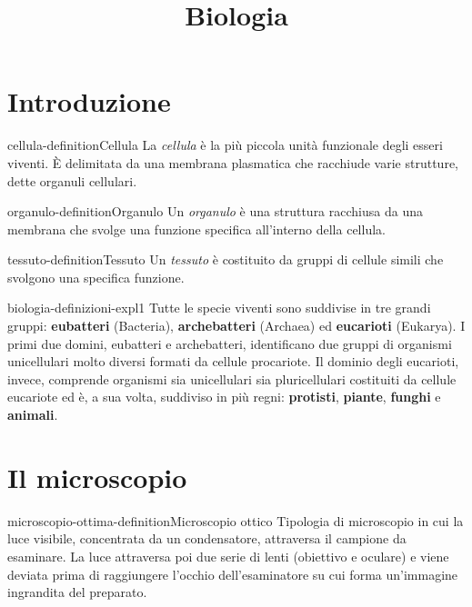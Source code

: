 \documentclass[preview]{standalone}
\begin{document}
\title{Biologia}
\genpage

\section{Introduzione}

\begin{snippetdefinition}{cellula-definition}{Cellula}
    La \textit{cellula} è la più piccola unità funzionale degli esseri
    viventi. È delimitata da una membrana plasmatica
    che racchiude varie strutture, dette organuli cellulari.
\end{snippetdefinition}

\begin{snippetdefinition}{organulo-definition}{Organulo}
    Un \textit{organulo} è una struttura racchiusa da una membrana che svolge
    una funzione specifica all'interno della cellula.
\end{snippetdefinition}

\begin{snippetdefinition}{tessuto-definition}{Tessuto}
    Un \textit{tessuto} è costituito da gruppi
    di cellule simili che svolgono
    una specifica funzione.
\end{snippetdefinition}

\begin{snippet}{biologia-definizioni-expl1}
Tutte le specie viventi sono suddivise in tre grandi gruppi:
\textbf{eubatteri} (Bacteria), \textbf{archebatteri} (Archaea)
ed \textbf{eucarioti} (Eukarya).
I primi due domini, eubatteri e archebatteri, identificano due gruppi di organismi
unicellulari molto diversi formati da cellule
procariote.
Il dominio degli eucarioti, invece, comprende organismi sia unicellulari
sia pluricellulari costituiti da cellule eucariote ed è,
a sua volta, suddiviso in più regni: \textbf{protisti},
\textbf{piante}, \textbf{funghi} e \textbf{animali}.
\end{snippet}

\section{Il microscopio}

\begin{snippetdefinition}{microscopio-ottima-definition}{Microscopio ottico}
    Tipologia di microscopio in cui la luce visibile, concentrata da un condensatore, attraversa
    il campione da esaminare. La luce attraversa poi due serie di lenti (obiettivo e oculare) e
    viene deviata prima di raggiungere l'occhio dell'esaminatore su cui forma un'immagine
    ingrandita del preparato.
\end{snippetdefinition}
\end{document}
